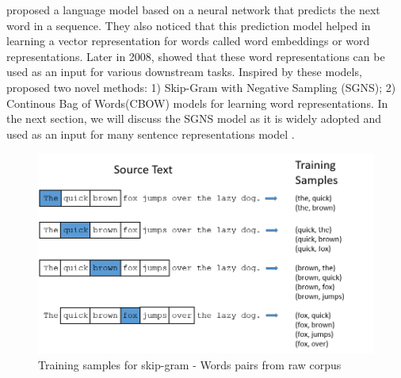 \documentclass[12pt]{report} %
\begin{document}
\cite{bengio2003neural} proposed a language model based on a neural network that predicts the next word in a sequence. They also noticed that this prediction model helped in learning a vector representation for words called word embeddings or word representations.
Later in 2008, \cite{collobert2008unified} showed that these word representations can be used as an input for various downstream tasks.
Inspired by these models, \cite{mikolov2014word2vec} proposed two novel methods: 1) Skip-Gram with Negative Sampling (SGNS); 2) Continous Bag of Words(CBOW) models for learning word representations. In the next section, we will discuss the SGNS model as it is widely adopted and used as an input for many sentence representations model \citep{kiros2015skip}.

\begin{figure}[!tbp]
	\centering
	\includegraphics[scale=0.70]{image/train_samples.png}
	\caption{Training samples for skip-gram - Words pairs from raw corpus}
	\label{train_sam}
\end{figure}
\end{document}
